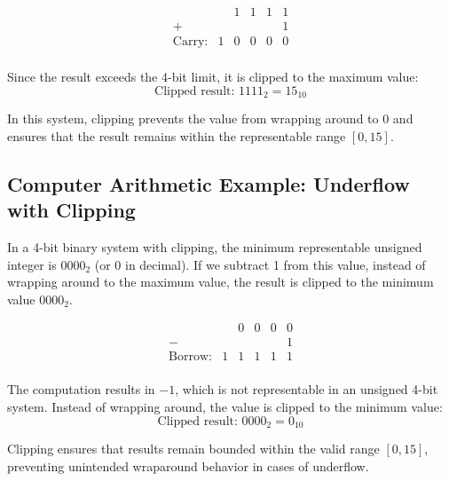 \[
\begin{array}{rccccc}
       & & 1 & 1 & 1 & 1 \\ %
    +  & &   &   &   & 1 \\ %
    \hline
\text{Carry:} & 1 & 0 & 0 & 0 & 0 \\ %
\end{array}
\]

Since the result exceeds the 4-bit limit, it is clipped to the maximum value:
\[
\text{Clipped result: } 1111_2 = 15_{10}
\]

In this system, clipping prevents the value from wrapping around to 0 and ensures that the result remains within the representable range \( [0, 15] \).

\subsection{Computer Arithmetic Example: Underflow with Clipping} \label{subsub:underflow_clipping_example}
In a 4-bit binary system with clipping, the minimum representable unsigned integer is \( 0000_2 \) (or 0 in decimal). If we subtract 1 from this value, instead of wrapping around to the maximum value, the result is clipped to the minimum value \( 0000_2 \).

\[
\begin{array}{rccccc}
       &   & 0 & 0 & 0 & 0 \\ %
    -  &   &   &   &   & 1 \\ %
    \hline
\text{Borrow:} & 1 & 1 & 1 & 1 & 1 \\ %
\end{array}
\]

The computation results in \( -1 \), which is not representable in an unsigned 4-bit system. Instead of wrapping around, the value is clipped to the minimum value:
\[
\text{Clipped result: } 0000_2 = 0_{10}
\]

Clipping ensures that results remain bounded within the valid range \( [0, 15] \), preventing unintended wraparound behavior in cases of underflow.


